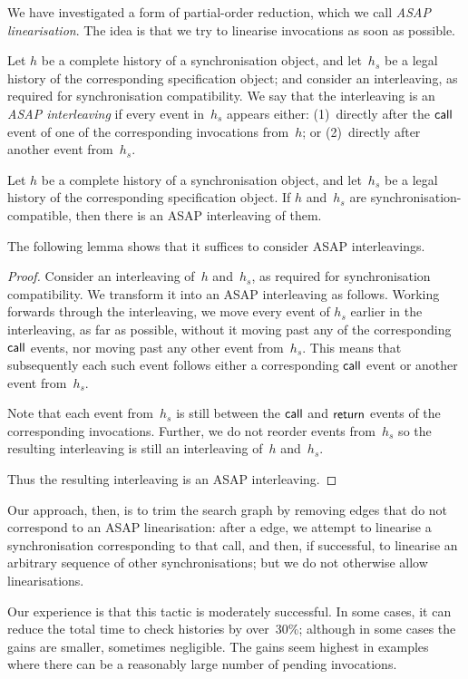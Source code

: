 We have investigated a form of partial-order reduction, which we call
\emph{ASAP linearisation}.  The idea is that we try to linearise invocations
as soon as possible.
%
\begin{definition}
Let $h$ be a complete history of a synchronisation object, and let~$h_s$ be a
legal history of the corresponding specification object; and consider an
interleaving, as required for synchronisation compatibility.  We say that the
interleaving is an \emph{ASAP interleaving} if every event in~$h_s$ appears
either: (1)~directly after the $\mathsf{call}$ event of one of the corresponding
invocations from~$h$; or (2)~directly after another event from~$h_s$.
\end{definition}
%
\begin{lemma}
Let $h$ be a complete history of a synchronisation object, and let~$h_s$ be a
legal history of the corresponding specification object.  If $h$ and~$h_s$ are
synchronisation-compatible, then there is an ASAP interleaving of them.
\end{lemma}
%
The following lemma shows that it suffices to consider ASAP interleavings.
%
\begin{proof}
Consider an interleaving of~$h$ and~$h_s$, as required for synchronisation
compatibility.  We transform it into an ASAP interleaving as follows.  Working
forwards through the interleaving, we move every event of $h_s$ earlier in the
interleaving, as far as possible, without it moving past any of the corresponding
$\mathsf{call}$ events, nor moving past any other event from~$h_s$.  This means that
subsequently each such event follows either a corresponding $\mathsf{call}$ event or
another event from~$h_s$.

Note that each event from~$h_s$ is still between the $\mathsf{call}$ and $\mathsf{return}$
events of the corresponding invocations.  Further, we do not reorder events
from~$h_s$ so the resulting interleaving is still an interleaving of~$h$
and~$h_s$.

Thus the resulting interleaving is an ASAP interleaving.
\end{proof}
%
Our approach, then, is to trim the search graph by removing
 edges that do not correspond to an ASAP
linearisation: after a  edge, we attempt to linearise a
synchronisation corresponding to that call, and then, if successful, to
linearise an arbitrary sequence of other synchronisations; but we do not
otherwise allow linearisations.

Our experience is that this tactic is moderately successful.  In some cases,
it can reduce the total time to check histories by over~30\%;
although in some cases the gains are smaller, sometimes negligible.  The gains
seem highest in examples where there can be a reasonably large number of
pending invocations.
 
